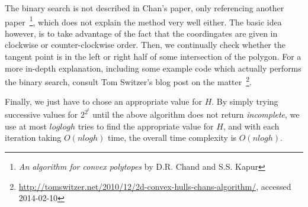 \documentclass[11pt,a4paper]{article}
\begin{document}
The binary search is not described in Chan's paper, only referencing
another paper~\footnote{\emph{An algorithm for convex polytopes} by
  D.R. Chand and S.S. Kapur}, which does not explain the method very
well either. The basic idea however, is to take advantage of the fact
that the coordingates are given in clockwise or counter-clockwise
order. Then, we continually check whether the tangent point is in the
left or right half of some intersection of the polygon. For a more
in-depth explanation, including some example code which actually
performs the binary search, consult Tom Switzer's blog post on the
matter~\footnote{\url{http://tomswitzer.net/2010/12/2d-convex-hulls-chans-algorithm/},
  accessed 2014-02-10}.

Finally, we just have to chose an appropriate value for $H$. By simply
trying successive values for $2^2^t$ until the above algorithm does
not return \emph{incomplete}, we use at most $log log h$ tries to find
the appropriate value for $H$, and with each iteration taking $O(n log
h)$ time, the overall time complexity is $O(n log h)$.
\end{document}
